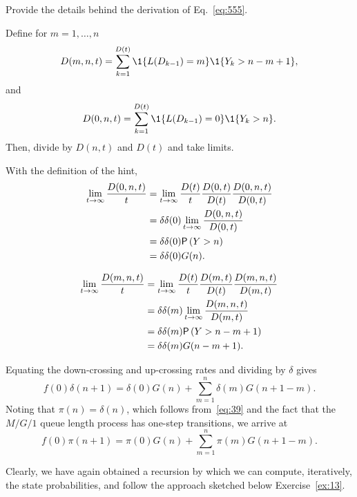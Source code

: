 \begin{exercise}
Provide the details behind the derivation of Eq.~\eqref{eq:555}.
\begin{hint}
Define for $m=1,\ldots, n$
\begin{equation*}
  D(m, n, t) = \sum_{k=1}^{D(t)}\1{L(D_{k-1})=m}\1{Y_k>n-m+1},
\end{equation*}
and 
\begin{equation*}
  D(0, n, t) = \sum_{k=1}^{D(t)}\1{L(D_{k-1})=0}\1{Y_k>n}.
\end{equation*}
Then, divide by $D(n,t)$ and $D(t)$ and take limits.
\end{hint}
\begin{solution}
With the definition of the hint, 
\begin{align*}
  \lim_{t\to\infty} \frac{  D(0, n, t)}t 
&=   \lim_{t\to\infty}  \frac{D(t)}t \frac{D(0, t)}{D(t)}\frac{ D(0, n, t)}{D(0,t)} \\
&=   \delta \delta(0) \lim_{t\to\infty} \frac{ D(0, n, t)}{D(0,t)} \\
&=   \delta \delta(0) \P{Y>n}\\
& = \delta \delta(0) G(n).
\end{align*}

\begin{align*}
  \lim_{t\to\infty} \frac{  D(m, n, t)}t 
&=   \lim_{t\to\infty}  \frac{D(t)}t \frac{D(m, t)}{D(t)}\frac{ D(m, n, t)}{D(m,t)} \\
&=   \delta \delta(m) \lim_{t\to\infty} \frac{ D(m, n, t)}{D(m,t)} \\
&=   \delta \delta(m) \P{Y>n-m+1}\\
& = \delta \delta(m) G(n-m+1).
\end{align*}
\end{solution}
\end{exercise}

Equating the down-crossing and up-crossing rates and dividing
by $\delta$ gives
\begin{equation*}
  f(0) \delta(n+1) = \delta(0) G(n) + \sum_{m=1}^{n} \delta(m) G(n+1-m).
\end{equation*}
Noting that $\pi(n) = \delta(n)$, which follows from~\eqref{eq:39} and
the fact that the $M/G/1$ queue length process has one-step
transitions, we arrive at
\begin{equation}\label{eq:72}
  f(0) \pi(n+1) = \pi(0) G(n) + \sum_{m=1}^{n} \pi(m) G(n+1-m).
\end{equation}

Clearly, we have  again obtained a recursion by which we can compute, iteratively, the
state probabilities, and follow the approach sketched below Exercise~\ref{ex:13}. 



